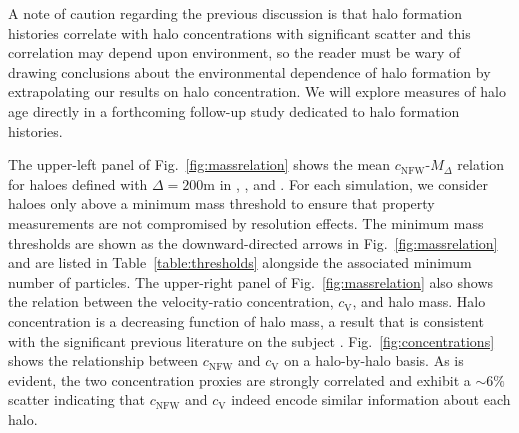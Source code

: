 \documentclass[usenatbib,fleqn]{mnras}
\begin{document}
A note of caution regarding the previous discussion is that halo formation histories correlate with halo concentrations with significant scatter and this correlation may depend upon environment, so the reader must be wary of drawing conclusions about the environmental dependence of halo formation by extrapolating our results on halo concentration. We will explore measures of halo age directly in a forthcoming follow-up study dedicated to halo formation histories.

The upper-left panel of Fig.~\ref{fig:massrelation} shows the mean $c_{\mathrm{NFW}}$-$M_{\Delta}$ relation for haloes defined with $\Delta=200$m in \simA, \simB, and \simC. For each simulation, we consider haloes only above a minimum mass threshold to ensure that property measurements are not compromised by resolution effects. The minimum mass thresholds are shown as the downward-directed arrows in Fig.~\ref{fig:massrelation} and are listed in Table~\ref{table:thresholds} alongside the associated minimum number of particles. The upper-right panel of Fig.~\ref{fig:massrelation} also shows the relation between the velocity-ratio concentration, $c_{\mathrm{V}}$, and halo mass. Halo concentration is a decreasing function of halo mass, a result that is consistent with the significant previous literature on the subject \citep[e.g.,][and references therein]{bullock_etal01, maccio_etal07,duffy_etal08,prada_etal12,klypin_etal16}.  Fig.~\ref{fig:concentrations} shows the relationship between $c_{\mathrm{NFW}}$ and $c_{\mathrm{V}}$ on a halo-by-halo basis. As is evident, the two concentration proxies are strongly correlated and exhibit a $\sim 6\%$ scatter indicating that $c_{\mathrm{NFW}}$ and $c_{\mathrm{V}}$ indeed encode similar information about each halo. 
\end{document}
